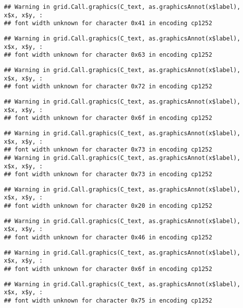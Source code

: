 \documentclass[
]{article}
\begin{document}
\begin{verbatim}
## Warning in grid.Call.graphics(C_text, as.graphicsAnnot(x$label), x$x, x$y, :
## font width unknown for character 0x41 in encoding cp1252
\end{verbatim}

\begin{verbatim}
## Warning in grid.Call.graphics(C_text, as.graphicsAnnot(x$label), x$x, x$y, :
## font width unknown for character 0x63 in encoding cp1252
\end{verbatim}

\begin{verbatim}
## Warning in grid.Call.graphics(C_text, as.graphicsAnnot(x$label), x$x, x$y, :
## font width unknown for character 0x72 in encoding cp1252
\end{verbatim}

\begin{verbatim}
## Warning in grid.Call.graphics(C_text, as.graphicsAnnot(x$label), x$x, x$y, :
## font width unknown for character 0x6f in encoding cp1252
\end{verbatim}

\begin{verbatim}
## Warning in grid.Call.graphics(C_text, as.graphicsAnnot(x$label), x$x, x$y, :
## font width unknown for character 0x73 in encoding cp1252
## Warning in grid.Call.graphics(C_text, as.graphicsAnnot(x$label), x$x, x$y, :
## font width unknown for character 0x73 in encoding cp1252
\end{verbatim}

\begin{verbatim}
## Warning in grid.Call.graphics(C_text, as.graphicsAnnot(x$label), x$x, x$y, :
## font width unknown for character 0x20 in encoding cp1252
\end{verbatim}

\begin{verbatim}
## Warning in grid.Call.graphics(C_text, as.graphicsAnnot(x$label), x$x, x$y, :
## font width unknown for character 0x46 in encoding cp1252
\end{verbatim}

\begin{verbatim}
## Warning in grid.Call.graphics(C_text, as.graphicsAnnot(x$label), x$x, x$y, :
## font width unknown for character 0x6f in encoding cp1252
\end{verbatim}

\begin{verbatim}
## Warning in grid.Call.graphics(C_text, as.graphicsAnnot(x$label), x$x, x$y, :
## font width unknown for character 0x75 in encoding cp1252
\end{verbatim}
\end{document}
